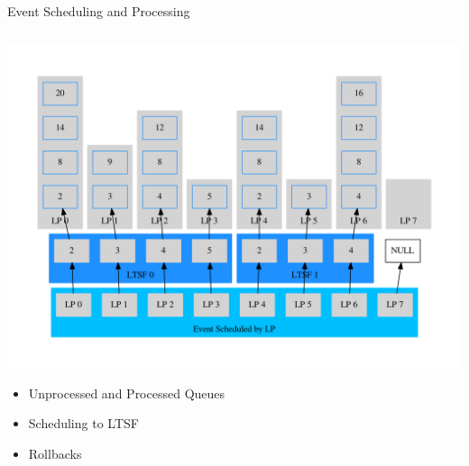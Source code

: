 \documentclass[10pt]{beamer}
\begin{document}
\begin{frame}{Event Scheduling and Processing}
\begin{columns}
        \begin{column}{0.6\textwidth}
            \includegraphics[width=\textwidth]{../figs/graphviz/pending_event_set.pdf}
            \begin{itemize}
                \item Unprocessed and Processed Queues
                \item Scheduling to LTSF
                \item Rollbacks
            \end{itemize}
        \end{column}

    \end{columns}
\end{frame}
\end{document}
